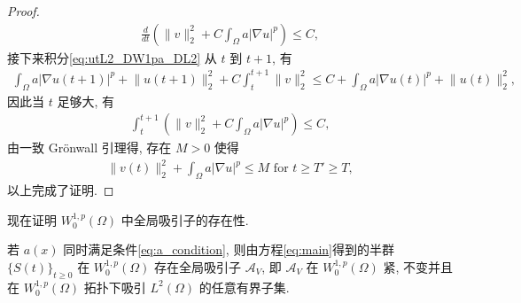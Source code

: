\documentclass[oneside,longtitle]{LZUthesis}
\numberwithin{equation}{chapter}
\newcommand*\abs[1]{\lvert#1\rvert}
\newcommand*\norm[1]{\lVert#1\rVert}
\newcommand*\Brace[1]{\lbrace#1\rbrace}
\begin{document}
\begin{proof}
\begin{equation*}
		\begin{split}
			\frac{d}{dt}\left(
			\norm{v}_2^2 + C\int_{\Omega}a\abs{\nabla u}^p
			\right)
			\leq C,
		\end{split}
	\end{equation*}
	接下来积分\cref{eq:utL2_DW1pa_DL2} 从 $t$ 到 $t+1$, 有
	\begin{equation*}
		\begin{split}
			\int_{\Omega}a\abs{\nabla u(t+1)}^p
			+ \norm{u(t+1)}_2^2
			+ C\int_t^{t+1}\norm{v}_2^2
			\leq C + \int_{\Omega}a\abs{\nabla u(t)}^p
			+ \norm{u(t)}_2^2,
		\end{split}
	\end{equation*}
	因此当 $t$ 足够大, 有
	\begin{equation*}
		\begin{split}
			\int_t^{t+1}\left(
			\norm{v}_2^2 + C\int_{\Omega}a\abs{\nabla u}^p
			\right) \leq C,
		\end{split}
	\end{equation*}
	由一致 Gr\"onwall 引理得, 存在 $M > 0$ 使得
	\begin{equation*}
		\begin{split}
			\norm{v(t)}_2^2
			+ \int_{\Omega}a\abs{\nabla u}^p \leq M \text{ for } t \geq T' \geq T,
		\end{split}
	\end{equation*}
	以上完成了证明.
\end{proof}
现在证明
$W_0^{1,p}(\Omega)$ 中全局吸引子的存在性.
\begin{theorem}
	若 $a(x)$ 同时满足条件\eqref{eq:a_condition},
	则由方程\eqref{eq:main}得到的半群 $\Brace{S(t)}_{t \geq 0}$ 在 $W_0^{1,p}(\Omega)$
	存在全局吸引子 $\mathcal{A}_V$, 即
	$\mathcal{A}_V$ 在 $W_0^{1,p}(\Omega)$ 紧, 不变并且在 $W_0^{1,p}(\Omega)$
	拓扑下吸引 $L^2(\Omega)$ 的任意有界子集.
\end{theorem}
\end{document}
